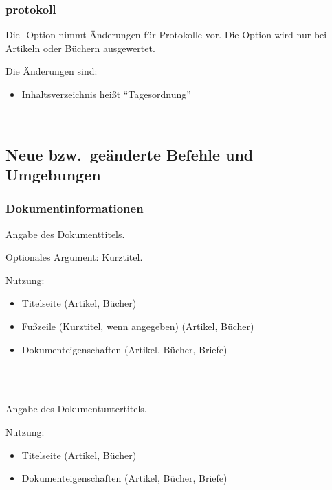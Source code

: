 \subsubsection{protokoll}

Die -Option nimmt Änderungen für Protokolle vor.
Die Option wird nur bei Artikeln oder Büchern ausgewertet.

Die Änderungen sind:
\begin{itemize}
	\item Inhaltsverzeichnis heißt "`Tagesordnung"'
\end{itemize}

\begin{nutzung}
		\>\\
\end{nutzung}



\subsection{Neue bzw.\ geänderte Befehle und Umgebungen}

\subsubsection{Dokumentinformationen}

\DescribeMacro{\title}
Angabe des Dokumenttitels.

Optionales Argument: Kurztitel.

Nutzung:
\begin{itemize}
	\item Titelseite (Artikel, Bücher)
	\item Fußzeile (Kurztitel, wenn angegeben) (Artikel, Bücher)
	\item Dokumenteigenschaften (Artikel, Bücher, Briefe)
\end{itemize}

\begin{nutzung}
		\>\\
	\beispiel
		\>\\
		\>
\end{nutzung}

\DescribeMacro{\subtitle}
Angabe des Dokumentuntertitels.

Nutzung:
\begin{itemize}
	\item Titelseite (Artikel, Bücher)
	\item Dokumenteigenschaften (Artikel, Bücher, Briefe)
\end{itemize}

